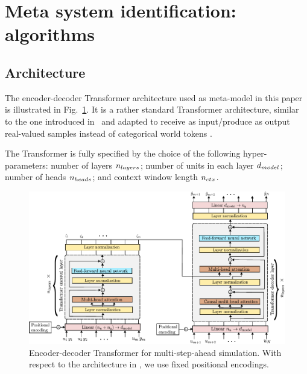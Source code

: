 \documentclass{ifacconf}
\begin{document}
\section{Meta system identification: algorithms} \label{sec:meta_sys}

\subsection{Architecture}
The encoder-decoder Transformer architecture used as meta-model in this paper is illustrated in Fig.~\ref{fig:encoder_decoder_arch}. It is a rather standard Transformer architecture, similar to the one introduced in~\citet{vaswani2017attention} and adapted to receive as input/produce as output real-valued samples instead of categorical world tokens \citep{forgione2023context}. 

The   Transformer  is fully specified by the choice of the following hyper-parameters: number of layers $n_{\rm layers}$; number of units in each layer $d_{\rm model}$; number of heads $n_{\rm heads}$; and context window length $n_{\rm ctx}$. 


\begin{figure}[!bt]
\centering
\includegraphics[width=.7\textwidth]{img/architecture/encoder_decoder_architecture.pdf}
\caption{Encoder-decoder Transformer  for multi-step-ahead simulation. 
With respect to the architecture in \citet{forgione2023context}, we use fixed positional encodings.}
\label{fig:encoder_decoder_arch}
\end{figure}
\end{document}
